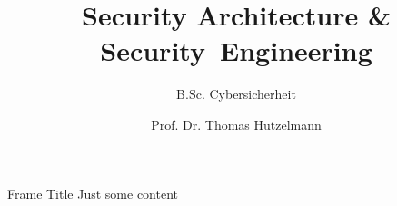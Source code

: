 \documentclass[12pt,aspectratio=169]{beamer}
\author{Prof. Dr. Thomas Hutzelmann}
\title{Security Architecture \& Security~Engineering}
\subtitle{B.Sc. Cybersicherheit}
\begin{document}
\maketitle

\begin{frame}{Frame Title}
Just some content
\end{frame}
\end{document}
